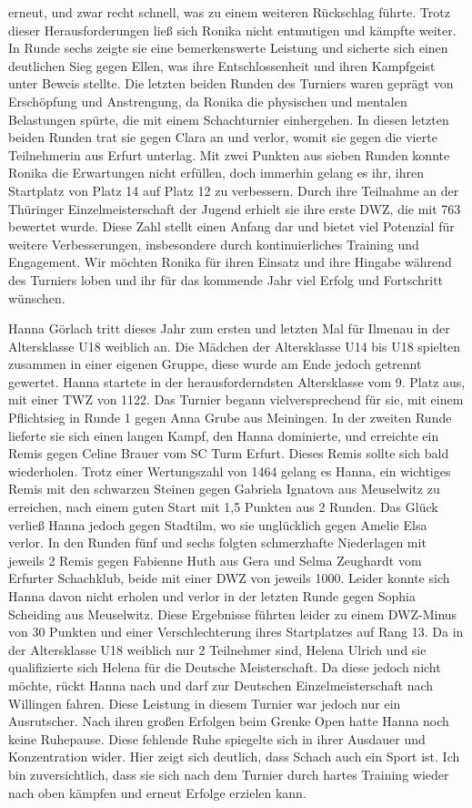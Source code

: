 \documentclass[a4paper,ngerman]{tui-algo-seminar}
\begin{document}
 erneut, und zwar recht schnell, was zu einem weiteren Rückschlag führte. Trotz dieser Herausforderungen ließ sich Ronika nicht entmutigen und kämpfte weiter. In Runde sechs zeigte sie eine bemerkenswerte Leistung und sicherte sich einen deutlichen Sieg gegen Ellen, was ihre Entschlossenheit und ihren Kampfgeist unter Beweis stellte. Die letzten beiden Runden des Turniers waren geprägt von Erschöpfung und Anstrengung, da Ronika die physischen und mentalen Belastungen spürte, die mit einem Schachturnier einhergehen. In diesen letzten beiden Runden trat sie gegen Clara an und verlor, womit sie gegen die vierte Teilnehmerin aus Erfurt unterlag. Mit zwei Punkten aus sieben Runden konnte Ronika die Erwartungen nicht erfüllen, doch immerhin gelang es ihr, ihren Startplatz von Platz 14 auf Platz 12 zu verbessern. Durch ihre Teilnahme an der Thüringer Einzelmeisterschaft der Jugend erhielt sie ihre erste DWZ, die mit 763 bewertet wurde. Diese Zahl stellt einen Anfang dar und bietet viel Potenzial für weitere Verbesserungen, insbesondere durch kontinuierliches Training und Engagement. Wir möchten Ronika für ihren Einsatz und ihre Hingabe während des Turniers loben und ihr für das kommende Jahr viel Erfolg und Fortschritt wünschen.

Hanna Görlach tritt dieses Jahr zum ersten und letzten Mal für Ilmenau in der Altersklasse U18 weiblich an. Die Mädchen der Altersklasse U14 bis U18 spielten zusammen in einer eigenen Gruppe, diese wurde am Ende jedoch getrennt gewertet. Hanna startete in der herausforderndsten Altersklasse vom 9. Platz aus, mit einer TWZ von 1122. Das Turnier begann vielversprechend für sie, mit einem Pflichtsieg in Runde 1 gegen Anna Grube aus Meiningen. In der zweiten Runde lieferte sie sich einen langen Kampf, den Hanna dominierte, und erreichte ein Remis gegen Celine Brauer vom SC Turm Erfurt. Dieses Remis sollte sich bald wiederholen. Trotz einer Wertungszahl von 1464 gelang es Hanna, ein wichtiges Remis mit den schwarzen Steinen gegen Gabriela Ignatova aus Meuselwitz zu erreichen, nach einem guten Start mit 1,5 Punkten aus 2 Runden. Das Glück verließ Hanna jedoch gegen Stadtilm, wo sie unglücklich gegen Amelie Elsa verlor. In den Runden fünf und sechs folgten schmerzhafte Niederlagen mit jeweils 2 Remis gegen Fabienne Huth aus Gera und Selma Zeughardt vom Erfurter Schachklub, beide mit einer DWZ von jeweils 1000. Leider konnte sich Hanna davon nicht erholen und verlor in der letzten Runde gegen Sophia Scheiding aus Meuselwitz. Diese Ergebnisse führten leider zu einem DWZ-Minus von 30 Punkten und einer Verschlechterung ihres Startplatzes auf Rang 13. Da in der Altersklasse U18 weiblich nur 2 Teilnehmer sind, Helena Ulrich und sie qualifizierte sich Helena für die Deutsche Meisterschaft. Da diese jedoch nicht möchte, rückt Hanna nach und darf zur Deutschen Einzelmeisterschaft nach Willingen fahren. Diese Leistung in diesem Turnier war jedoch nur ein Ausrutscher. Nach ihren großen Erfolgen beim Grenke Open hatte Hanna noch keine Ruhepause. Diese fehlende Ruhe spiegelte sich in ihrer Ausdauer und Konzentration wider. Hier zeigt sich deutlich, dass Schach auch ein Sport ist. Ich bin zuversichtlich, dass sie sich nach dem Turnier durch hartes Training wieder nach oben kämpfen und erneut Erfolge erzielen kann.
\end{document}
